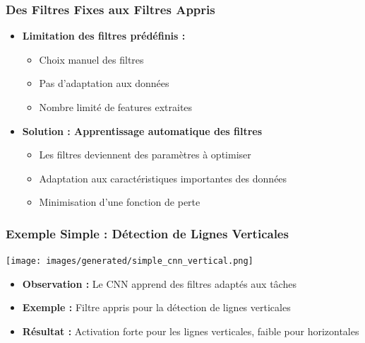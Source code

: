 \documentclass{beamer}
\begin{document}
\begin{frame}
    \frametitle{Des Filtres Fixes aux Filtres Appris}
    \begin{itemize}
        \item \textbf{Limitation des filtres prédéfinis :}
        \begin{itemize}
            \item Choix manuel des filtres
            \item Pas d'adaptation aux données
            \item Nombre limité de features extraites
        \end{itemize}
        \item \textbf{Solution : Apprentissage automatique des filtres}
        \begin{itemize}
            \item Les filtres deviennent des paramètres à optimiser
            \item Adaptation aux caractéristiques importantes des données
            \item Minimisation d'une fonction de perte
        \end{itemize}
    \end{itemize}
\end{frame}

\begin{frame}
    \frametitle{Exemple Simple : Détection de Lignes Verticales}
    \begin{center}
        \texttt{[image: images/generated/simple\_cnn\_vertical.png]}
    \end{center}
    \begin{itemize}
        \item \textbf{Observation :} Le CNN apprend des filtres adaptés aux tâches
        \item \textbf{Exemple :} Filtre appris pour la détection de lignes verticales
        \item \textbf{Résultat :} Activation forte pour les lignes verticales, faible pour horizontales
    \end{itemize}
\end{frame}
\end{document}
